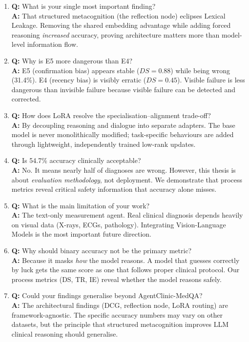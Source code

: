 \begin{vivabox}[\textcolor{white}{Likely Viva Questions}]
\begin{enumerate}
    \item \textbf{Q:} What is your single most important finding?\\
    \textbf{A:} That structured metacognition (the reflection node) eclipses Lexical Leakage. Removing the shared embedding advantage while adding forced reasoning \textit{increased} accuracy, proving architecture matters more than model-level information flow.

    \item \textbf{Q:} Why is E5 more dangerous than E4?\\
    \textbf{A:} E5 (confirmation bias) appears stable ($DS = 0.88$) while being wrong (31.4\%). E4 (recency bias) is visibly erratic ($DS = 0.45$). Visible failure is less dangerous than invisible failure because visible failure can be detected and corrected.

    \item \textbf{Q:} How does LoRA resolve the specialisation--alignment trade-off?\\
    \textbf{A:} By decoupling reasoning and dialogue into separate adapters. The base model is never monolithically modified; task-specific behaviours are added through lightweight, independently trained low-rank updates.

    \item \textbf{Q:} Is 54.7\% accuracy clinically acceptable?\\
    \textbf{A:} No. It means nearly half of diagnoses are wrong. However, this thesis is about \textit{evaluation methodology}, not deployment. We demonstrate that process metrics reveal critical safety information that accuracy alone misses.

    \item \textbf{Q:} What is the main limitation of your work?\\
    \textbf{A:} The text-only measurement agent. Real clinical diagnosis depends heavily on visual data (X-rays, ECGs, pathology). Integrating Vision-Language Models is the most important future direction.

    \item \textbf{Q:} Why should binary accuracy not be the primary metric?\\
    \textbf{A:} Because it masks \textit{how} the model reasons. A model that guesses correctly by luck gets the same score as one that follows proper clinical protocol. Our process metrics (DS, TR, IE) reveal whether the model reasons safely.

    \item \textbf{Q:} Could your findings generalise beyond AgentClinic-MedQA?\\
    \textbf{A:} The architectural findings (DCG, reflection node, LoRA routing) are framework-agnostic. The specific accuracy numbers may vary on other datasets, but the principle that structured metacognition improves LLM clinical reasoning should generalise.
\end{enumerate}
\end{vivabox}
